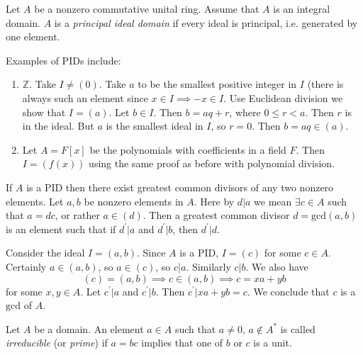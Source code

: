 \begin{defn}

Let $A$ be a nonzero commutative unital ring. Assume that $A$ is an
integral domain. $A$ is a \emph{principal ideal domain} if every ideal
is principal, i.e. generated by one element.
\end{defn}

\begin{xmpl}
Examples of PIDs include:
\begin{enumerate}
  \item{
    $\mathbb{Z}$. Take $I \neq (0)$. Take $a$ to be the smallest
    positive integer in $I$ (there is always such an element since $x
    \in I \implies -x \in I$. Use Euclidean division we show that
    $I = (a)$. Let $b \in I$. Then $b = aq + r$, where $0 \leq r <
    a$. Then $r$ is in the ideal. But $a$ is the smallest ideal in
    $I$, so $r = 0$. Then $b = aq \in (a)$.
  }
  \item{
    Let $A = F[x]$ be the polynomials with coefficients in a field
    $F$. Then $I = (f(x))$ using the same proof as before with
    polynomial division.
  }
\end{enumerate}
\end{xmpl}

\begin{obsv}
If $A$ is a PID then there exist greatest common divisors of any two
nonzero elements. Let $a, b$ be nonzero elements in $A$.
Here by $d \vert a$ we mean $\exists c \in A$ such that $a = dc$, or
rather $a \in (d)$. Then a greatest common divisor
$d = \mathrm{gcd}(a, b)$ is an element such that
if $d^\prime \vert a$ and $d^\prime \vert b$, then $d^\prime \vert d$.

Consider the ideal $I = (a, b)$. Since $A$ is a PID, $I = (c)$ for
some $c \in A$. Certainly $a \in (a,b)$, so $a \in (c)$, so
$c \vert a$. Similarly $c \vert b$. We also have
$$
(c) = (a, b) \implies c \in (a, b) \implies c = xa + yb
$$
for some $x, y \in A$.
Let $c^\prime \vert a$ and $c^\prime \vert b$. Then
$c^\prime \vert xa + yb = c$. We conclude that $c$ is a $\mathrm{gcd}$
of $A$.
\end{obsv}

\begin{defn}
Let $A$ be a domain. An element $a \in A$ such that $a \neq 0$,
$a \notin A^\ast$ is called \emph{irreducible} (or \emph{prime})
if $a = bc$ implies that one of $b$ or $c$ is a unit.
\end{defn}

